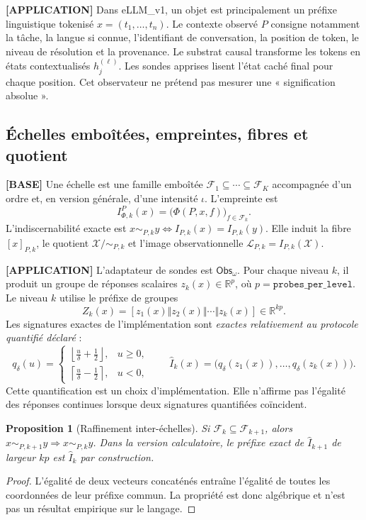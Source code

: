 \documentclass[11pt,a4paper]{article}
\newtheorem{proposition}[definition]{Proposition}
\newcommand{\R}{\mathbb R}\newcommand{\X}{\mathcal X}\newcommand{\Pctx}{\mathcal P}\newcommand{\F}{\mathcal F}\newcommand{\Lobs}{\mathcal L}\newcommand{\Cl}{\operatorname{Cl}}\newcommand{\Aff}{\operatorname{Aff}}\newcommand{\rank}{\operatorname{rank}}\newcommand{\softmax}{\operatorname{softmax}}\newcommand{\CE}{\operatorname{CE}}\newcommand{\supp}{\operatorname{supp}}
\begin{document}
\textbf{[APPLICATION]} Dans eLLM\_v1, un objet est principalement un préfixe linguistique tokenisé \(x=(t_1,\ldots,t_n)\). Le contexte observé \(P\) consigne notamment la tâche, la langue si connue, l'identifiant de conversation, la position de token, le niveau de résolution et la provenance. Le substrat causal transforme les tokens en états contextualisés \(h_j^{(\ell)}\). Les sondes apprises lisent l'état caché final pour chaque position. Cet observateur ne prétend pas mesurer une « signification absolue ».

\subsection{Échelles emboîtées, empreintes, fibres et quotient}
\textbf{[BASE]} Une échelle est une famille emboîtée \(\F_1\subseteq\cdots\subseteq\F_K\) accompagnée d'un ordre et, en version générale, d'une intensité \(\iota\). L'empreinte est
\[
I_{\Phi,k}^{P}(x)=\bigl(\Phi(P,x,f)\bigr)_{f\in\F_k}.
\]
L'indiscernabilité exacte est \(x\sim_{P,k}y\iff I_{P,k}(x)=I_{P,k}(y)\). Elle induit la fibre \([x]_{P,k}\), le quotient \(\X/\sim_{P,k}\) et l'image observationnelle \(\Lobs_{P,k}=I_{P,k}(\X)\).

\textbf{[APPLICATION]} L'adaptateur de sondes est \(\mathsf{Obs}_{\omega}\). Pour chaque niveau \(k\), il produit un groupe de réponses scalaires \(z_k(x)\in\R^p\), où \(p=\texttt{probes\_per\_level}\). Le niveau \(k\) utilise le préfixe de groupes
\[
Z_k(x)=[z_1(x)\Vert z_2(x)\Vert\cdots\Vert z_k(x)]\in\R^{kp}.
\]
Les signatures exactes de l'implémentation sont \emph{exactes relativement au protocole quantifié déclaré} :
\[
q_\delta(u)=\begin{cases}\left\lfloor\frac{u}{\delta}+\frac12\right\rfloor,&u\geq0,\\[0.2em]\left\lceil\frac{u}{\delta}-\frac12\right\rceil,&u<0,\end{cases}\qquad
\widehat I_k(x)=\bigl(q_\delta(z_1(x)),\ldots,q_\delta(z_k(x))\bigr).
\]
Cette quantification est un choix d'implémentation. Elle n'affirme pas l'égalité des réponses continues lorsque deux signatures quantifiées coïncident.

\begin{proposition}[Raffinement inter-échelles]
Si \(\F_k\subseteq\F_{k+1}\), alors \(x\sim_{P,k+1}y\Rightarrow x\sim_{P,k}y\). Dans la version calculatoire, le préfixe exact de \(\widehat I_{k+1}\) de largeur \(kp\) est \(\widehat I_k\) par construction.
\end{proposition}
\begin{proof}
L'égalité de deux vecteurs concaténés entraîne l'égalité de toutes les coordonnées de leur préfixe commun. La propriété est donc algébrique et n'est pas un résultat empirique sur le langage.
\end{proof}
\end{document}
